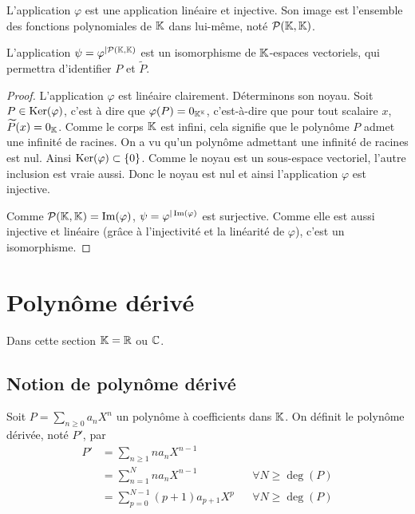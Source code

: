 \begin{prop}
  L'application \(\varphi\) est une application linéaire et injective. Son image
  est l'ensemble des fonctions polynomiales de \(\mathbb{K}\) dans lui-même, noté
  \(\mathcal{P}(\mathbb{K},\mathbb{K})\).

  L'application \(\psi = \varphi^{|\mathcal{P}(\mathbb{K},\mathbb{K})}\) est un isomorphisme de
  \(\mathbb{K}\)-espaces vectoriels, qui permettra d'identifier \(P\) et
  \(\widetilde{P}\).
\end{prop}
\begin{proof}
  L'application \(\varphi\) est linéaire clairement. Déterminons son noyau. Soit
  \(P \in \operatorname{Ker}(\varphi)\), c'est à dire que \(\varphi(P) = 0_{\mathbb{K}^{\mathbb{K}}}\),
  c'est-à-dire que pour tout scalaire \(x\), \(\widetilde{P}(x) = 0_{\mathbb{K}}\).
  Comme le corps \(\mathbb{K}\) est infini, cela signifie que le polynôme \(P\) admet
  une infinité de racines. On a vu qu'un polynôme admettant une infinité de
  racines est nul. Ainsi \(\operatorname{Ker}(\varphi) \subset \{0\}\). Comme le noyau est un
  sous-espace vectoriel, l'autre inclusion est vraie aussi. Donc le noyau est
  nul et ainsi l'application \(\varphi\) est injective.

  Comme \(\mathcal{P}(\mathbb{K},\mathbb{K}) = \operatorname{Im}(\varphi)\), \(\psi = \varphi^{|\operatorname{Im}(\varphi)}\) est
  surjective. Comme elle est aussi injective et linéaire (grâce à l'injectivité
  et la linéarité de \(\varphi\)), c'est un isomorphisme.
\end{proof}

\section{Polynôme dérivé}

Dans cette section \(\mathbb{K} = \mathbb{R}\) ou \(\mathbb{C}\).

\subsection{Notion de polynôme dérivé}

\begin{defdef}
  Soit \(P = \sum_{n \geqslant 0}a_n X^n\) un polynôme à coefficients dans
  \(\mathbb{K}\). On définit le polynôme dérivée, noté \(P'\), par
  \begin{align}
    P' &= \sum_{n \geqslant 1} na_n X^{n-1} \\
    & = \sum_{n = 1}^N na_n X^{n-1} && \forall N \geqslant \deg(P) \\
    & = \sum_{p = 0}^{N-1} (p+1)a_{p+1} X^{p} && \forall N \geqslant \deg(P) \\
  \end{align}
\end{defdef}

